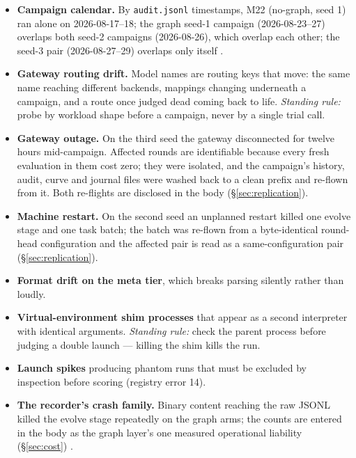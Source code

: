 \begin{itemize}
  \item \textbf{Campaign calendar.} By \texttt{audit.jsonl} timestamps, M22
        (no-graph, seed 1) ran alone on 2026-08-17--18; the graph seed-1
        campaign (2026-08-23--27) overlaps both seed-2 campaigns
        (2026-08-26), which overlap each other; the seed-3 pair
        (2026-08-27--29) overlaps only itself .
  \item \textbf{Gateway routing drift.} Model names are routing keys that
        move: the same name reaching different backends, mappings changing
        underneath a campaign, and a route once judged dead coming back to
        life. \emph{Standing rule:} probe by workload shape before a
        campaign, never by a single trial call.
  \item \textbf{Gateway outage.} On the third seed the gateway
        disconnected for twelve hours mid-campaign. Affected rounds are
        identifiable because every fresh evaluation in them cost zero;
        they were isolated, and the campaign's history, audit, curve and
        journal files were washed back to a clean prefix and re-flown from
        it. Both re-flights are disclosed in the body
        (\S\ref{sec:replication}).
  \item \textbf{Machine restart.} On the second seed an unplanned restart
        killed one evolve stage and one task batch; the batch was re-flown
        from a byte-identical round-head configuration and the affected
        pair is read as a same-configuration pair (\S\ref{sec:replication}).
  \item \textbf{Format drift on the meta tier}, which breaks parsing
        silently rather than loudly.
  \item \textbf{Virtual-environment shim processes} that appear as a second
        interpreter with identical arguments. \emph{Standing rule:} check
        the parent process before judging a double launch --- killing the
        shim kills the run.
  \item \textbf{Launch spikes} producing phantom runs that must be excluded
        by inspection before scoring (registry error 14).
  \item \textbf{The recorder's crash family.} Binary content reaching the
        raw JSONL killed the evolve stage repeatedly on the graph arms; the
        counts are entered in the body as the graph layer's one measured
        operational liability (\S\ref{sec:cost}) .
\end{itemize}

